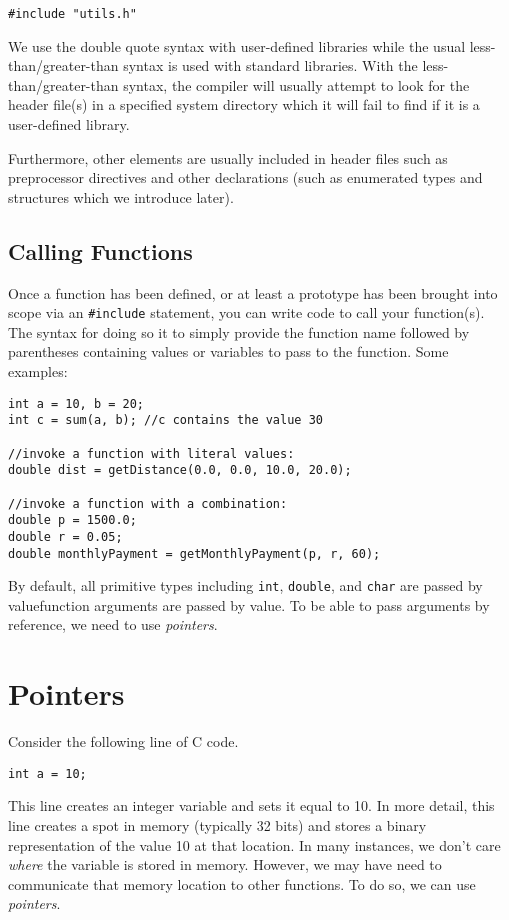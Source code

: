 \texttt{#include "utils.h"}

We use the double quote syntax with user-defined libraries while the
usual less-than/greater-than syntax is used with standard libraries.
With the less-than/greater-than syntax, the compiler will usually 
attempt to look for the header file(s) in a specified system directory
which it will fail to find if it is a user-defined library.

Furthermore, other elements are usually included in header files
such as preprocessor directives and other declarations (such as
enumerated types and structures which we introduce later).

\subsection{Calling Functions}

Once a function has been defined, or at least a prototype has
been brought into scope via an \texttt{#include} statement, 
you can write code to call your function(s).  The syntax for
doing so it to simply provide the function name followed by 
parentheses containing values or variables to pass to the function.
Some examples:

\begin{verbatim}
int a = 10, b = 20;
int c = sum(a, b); //c contains the value 30

//invoke a function with literal values:
double dist = getDistance(0.0, 0.0, 10.0, 20.0);

//invoke a function with a combination:
double p = 1500.0;
double r = 0.05;
double monthlyPayment = getMonthlyPayment(p, r, 60);
\end{verbatim}

By default, all primitive types including \texttt{int}, 
\texttt{double}, and \texttt{char} are passed by 
valuefunction arguments are passed by value.  To be
able to pass arguments by reference, we need to use
\emph{pointers}.

\section{Pointers}
\label{section:cPointers}

Consider the following line of C code.

\texttt{int a = 10;}

This line creates an integer variable and sets it equal to 10.  In
more detail, this line creates a spot in memory (typically 32 bits)
and stores a binary representation of the value 10 at that location.
In many instances, we don't care \emph{where} the variable
is stored in memory.  However, we may have need to communicate
that memory location to other functions.  To do so, we can use 
\emph{pointers}.

